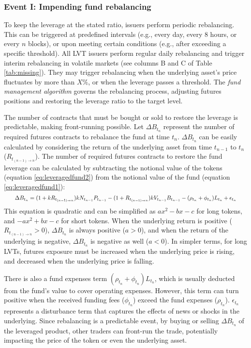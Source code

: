 \subsubsection{Event I: Impending fund rebalancing}\label{subsec:rebalancing}
To keep the leverage at the stated ratio, issuers perform periodic rebalancing. This can be triggered at predefined intervals (e.g., every day, every 8 hours, or every $n$ blocks), or upon meeting certain conditions (e.g., after exceeding a specific threshold). All LVT issuers perform regular daily rebalancing and trigger interim rebalancing in volatile markets (see columns B and C of Table \ref{tab:missing}). They may trigger rebalancing when the underlying asset's price fluctuates by more than $X\%$, or when the leverage passes a threshold. The \textsl{fund management algorithm} governs the rebalancing process, adjusting futures positions and restoring the leverage ratio to the target level.

The number of contracts that must be bought or sold to restore the leverage is predictable, making front-running possible. Let $\Delta B_{t_{n}}$ represent the number of required futures contracts to rebalance the fund at time $t_{n}$. $\Delta B_{t_{n}}$ can be easily calculated by considering the return of the underlying asset from time $t_{n-1}$ to $t_{n}$ ($R_{t_{(n-1)\to n}}$). The number of required futures contracts to restore the fund leverage can be calculated by subtracting the notional value of the tokens (equation \ref{eq:leveragedfund2}) from the notional value of the fund (equation \ref{eq:leveragedfund1}):
\begin{equation*}
	\resizebox{.95\hsize}{!}{$
		\Delta{B_{t_{n}}}=(1+kR_{t_{(n-1)\to n}})kN_{t_{n-1}}P_{t_{n-1}}-(1+R_{t_{(n-1)\to n}})kV_{t_{n-1}}B_{t_{n-1}}-(\rho_{t_{n}}+\phi_{t_{n}})L_{t_{n}}+\epsilon_{t_{n}}
		$}
\end{equation*}
This equation is quadratic and can be simplified as $ax^2 - bx - c$ for long tokens, and $-ax^2 + bx - c$ for short tokens. When the underlying return is positive ($R_{t_{(n-1)\to n}} > 0$), $\Delta{B_{t_{n}}}$ is always positive ($a > 0$), and when the return of the underlying is negative, $\Delta{B_{t_{n}}}$ is negative as well ($a < 0$). In simpler terms, for long LVTs, futures exposure must be increased when the underlying price is rising, and decreased when the underlying price is falling.

There is also a fund expenses term $(\rho_{t_{n}} + \phi_{t_{n}})L_{t_{n}}$, which is usually deducted from the fund's value to cover operating expenses. However, this term can turn positive when the received funding fees ($\phi_{t_{n}}$) exceed the fund expenses ($\rho_{t_{n}}$). $\epsilon_{t_{n}}$ represents a disturbance term that captures the effects of news or shocks in the underlying. Since rebalancing is a predictable event, by buying or selling $\Delta{B_{t_{n}}}$ of the leveraged product, other traders can front-run the trade, potentially impacting the price of the token or even the underlying asset.


